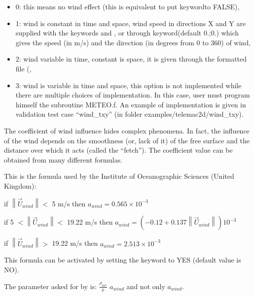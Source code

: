 \begin{itemize}
\item [\nonumber] 0: this means no wind effect (this is equivalent to put keywordto FALSE),

\item [\nonumber]1: wind is constant in time and space, wind speed in directions X and Y are supplied with the keywords  and , or through keyword(default 0.;0.) which gives the speed (in m/s) and the direction (in degrees from 0 to 360) of wind,

\item [\nonumber] 2: wind variable in time, constant is space, it is given through the formatted file (,

\item [\nonumber] 3: wind is variable in time and space, this option is not implemented while there are multiple choices of implementation. In this case, user must program himself the subroutine METEO.f. An example of implementation is given in validation test case ``wind\_txy'' (in folder examples/telemac2d/wind\_txy).
\end{itemize}

 The coefficient of wind influence hides complex phenomena. In fact, the influence of the wind depends on the smoothness (or, lack of it) of the free surface and the distance over which it acts (called the ``fetch''). The coefficient value can be obtained from many different formulas.

 This is the formula used by the Institute of Oceanographic Sciences (United Kingdom):



 if    $\left \|\vec{U}_{wind} \right \| <$ 5 m/s   then   $a_{wind}  = 0.565 \times 10^{-3}$

 if  5   $< \left \| \vec{U}_{wind}  \right \| <$ 19.22 m/s then    $a_{wind} = (- 0.12 + 0.137 \left \| \vec{U}_{wind}   \right \|) 10^{-3}$

 if    $\left \| \vec{U}_{wind}  \right \|   >$ 19.22 m/s   then     $a_{wind} = 2.513 \times 10^{-3}$

 This formula can be activated by setting the keyword
 to YES
(default value is NO).

 The parameter  asked for by  is: $\frac{{\rho }_{air}}{\mathrm{\rho }}$ $a_{wind}$ and not only $a_{wind}$.

